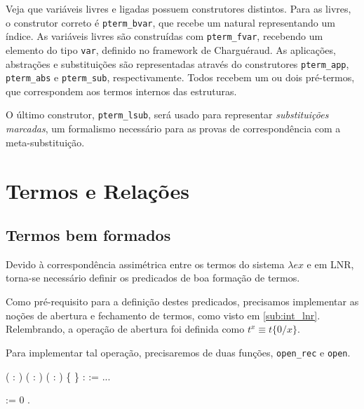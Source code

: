 Veja que variáveis livres e ligadas possuem construtores distintos. Para as
livres, o construtor correto é \texttt{pterm\_bvar}, que recebe um natural
representando um índice. As variáveis livres são construídas com
\texttt{pterm\_fvar}, recebendo um elemento do tipo \texttt{var}, definido no
framework de Charguéraud.
As aplicações, abstrações e substituições são representadas através do
construtores \texttt{pterm\_app}, \texttt{pterm\_abs} e \texttt{pterm\_sub},
respectivamente. Todos recebem um ou dois pré-termos, que correspondem aos
termos internos das estruturas.

O último construtor, \texttt{pterm\_lsub}, será usado para representar
\emph{substituições marcadas}, um formalismo necessário para as provas de
correspondência com a meta-substituição.

\section{Termos e Relações}
\subsection{Termos bem formados}

Devido à correspondência assimétrica entre os termos do sistema $\lambda ex$ e
em LNR, torna-se necessário definir os predicados de boa formação de termos.

Como pré-requisito para a definição destes predicados, precisamos implementar as
noções de abertura e fechamento de termos, como visto em \ref{sub:int_lnr}. 
Relembrando, a operação de abertura foi definida como $t^{x} \equiv t\{0/x\}$.

Para implementar tal operação, precisaremos de duas funções, \texttt{open\_rec}
e \texttt{open}.

\bigskip
{}  ( :
)
( : )
( : )
\{ \} :  := ...\coqdoceol

 
  :=  0 
.\coqdoceol
\bigskip


